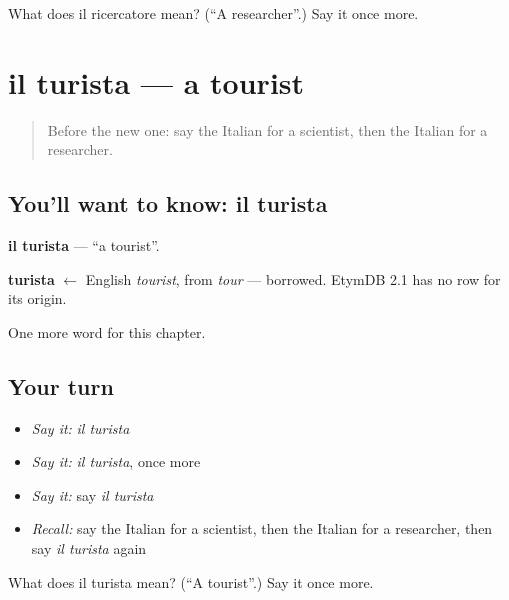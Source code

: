 \begin{tcolorbox}[breakable,colback=teal!4,colframe=teal!35!black,title={Before you move on}]
What does il ricercatore mean? (\textquotedblleft{}A researcher\textquotedblright{}.) Say it once more.
\end{tcolorbox}
\section[il turista]{il turista — a tourist}

\label{lesson:IT-C195-turista}



\begin{quote}
Before the new one: say the Italian for a scientist, then the Italian for a researcher.
\end{quote}

\subsection*{You'll want to know: il turista}
\textbf{il turista} — \textquotedblleft{}a tourist\textquotedblright{}.

\begin{cousinweb}
\textbf{turista} $\leftarrow$ English \emph{tourist}, from \emph{tour} — borrowed. EtymDB 2.1 has no row for its origin.
\end{cousinweb}

\begin{grammarlens}[title={What you've built}]
One more word for this chapter.
\end{grammarlens}

\subsection*{Your turn}
\begin{itemize}
\raggedright
  \item \emph{Say it:} \emph{il turista}
  \item \emph{Say it:} \emph{il turista}, once more
  \item \emph{Say it:} say \emph{il turista}
  \item \emph{Recall:} say the Italian for a scientist, then the Italian for a researcher, then say \emph{il turista} again
\end{itemize}

\begin{tcolorbox}[breakable,colback=teal!4,colframe=teal!35!black,title={Before you move on}]
What does il turista mean? (\textquotedblleft{}A tourist\textquotedblright{}.) Say it once more.
\end{tcolorbox}
